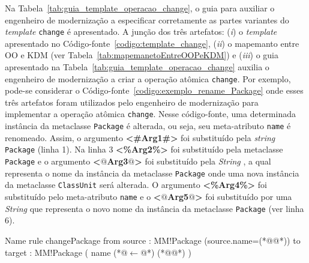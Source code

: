 Na Tabela~\ref{tab:guia_template_operacao_change}, o guia para auxiliar o engenheiro de modernização a especificar corretamente as partes variantes do \textit{template} \texttt{change} é apresentado. A junção dos três artefatos: (\textit{i}) o \textit{template} apresentado no Código-fonte~\ref{codigo:template_change}, (\textit{ii}) o mapemanto entre OO e KDM (ver Tabela~\ref{tab:mapemanetoEntreOOPeKDM}) e (\textit{iii}) o guia apresentado na Tabela~\ref{tab:guia_template_operacao_change} auxilia o engenheiro de modernização a criar a operação atômica \texttt{change}. Por exemplo, pode-se considerar o Código-fonte~\ref{codigo:exemplo_rename_Package} onde esses três artefatos foram utilizados pelo engenheiro de modernização para implementar a operação atômica \texttt{change}. Nesse código-fonte, uma determinada instância da metaclasse \texttt{Package} é alterada, ou seja, seu meta-atributo \texttt{name} é renomeado. Assim, o argumento \textbf{<\#Arg1\#>} foi substituído pela \textit{string} \texttt{Package} (linha 1). Na linha 3 \textbf{<\%Arg2\%>} foi substituído pela metaclasse \texttt{Package} e o argumento \textbf{<$@$Arg3$@$>} foi substituído pela \textit{String} \texttt{}, a qual representa o nome da instância da metaclasse \texttt{Package} onde uma nova instância da metaclasse \texttt{ClassUnit} será alterada. O argumento \textbf{<\%Arg4\%>} foi substituído pelo meta-atributo \texttt{name} e o \textbf{<$@$Arg5$@$>} foi substituído por uma \textit{String} que representa o novo nome da instância da metaclasse \texttt{Package} (ver linha 6).



\begin{codigo}[caption={[ATL para realizar a operação atômica \texttt{change} \texttt{ClassUnit}.] ATL para realizar a operação atômica \texttt{change} \texttt{ClassUnit}.},escapeinside={(*@}{@*)}, basicstyle=\footnotesize, label={codigo:exemplo_rename_Package}, language=ATL]{Name}
rule changePackage {
	from
		source : MM!Package (source.name=(*@@*))
	to 
		target : MM!Package (
			name (*@$\leftarrow$@*) (*@@*)
		)
}
\end{codigo}


